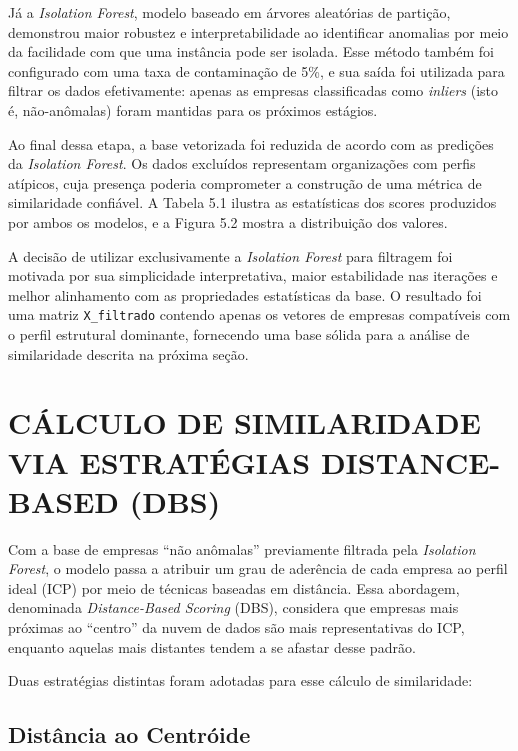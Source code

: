 Já a \textit{Isolation Forest}, modelo baseado em árvores aleatórias de partição, demonstrou maior robustez e interpretabilidade ao identificar anomalias por meio da facilidade com que uma instância pode ser isolada. Esse método também foi configurado com uma taxa de contaminação de 5\%, e sua saída foi utilizada para filtrar os dados efetivamente: apenas as empresas classificadas como \textit{inliers} (isto é, não-anômalas) foram mantidas para os próximos estágios.

Ao final dessa etapa, a base vetorizada foi reduzida de acordo com as predições da \textit{Isolation Forest}. Os dados excluídos representam organizações com perfis atípicos, cuja presença poderia comprometer a construção de uma métrica de similaridade confiável. A Tabela 5.1 ilustra as estatísticas dos scores produzidos por ambos os modelos, e a Figura 5.2 mostra a distribuição dos valores.



A decisão de utilizar exclusivamente a \textit{Isolation Forest} para filtragem foi motivada por sua simplicidade interpretativa, maior estabilidade nas iterações e melhor alinhamento com as propriedades estatísticas da base. O resultado foi uma matriz \texttt{X\_filtrado} contendo apenas os vetores de empresas compatíveis com o perfil estrutural dominante, fornecendo uma base sólida para a análise de similaridade descrita na próxima seção.

\section{CÁLCULO DE SIMILARIDADE VIA ESTRATÉGIAS DISTANCE-BASED (DBS)}

Com a base de empresas ``não anômalas'' previamente filtrada pela \textit{Isolation Forest}, o modelo passa a atribuir um grau de aderência de cada empresa ao perfil ideal (ICP) por meio de técnicas baseadas em distância. Essa abordagem, denominada \textit{Distance-Based Scoring} (DBS), considera que empresas mais próximas ao ``centro'' da nuvem de dados são mais representativas do ICP, enquanto aquelas mais distantes tendem a se afastar desse padrão.

Duas estratégias distintas foram adotadas para esse cálculo de similaridade:

\subsection{\textbf{Distância ao Centróide}}

